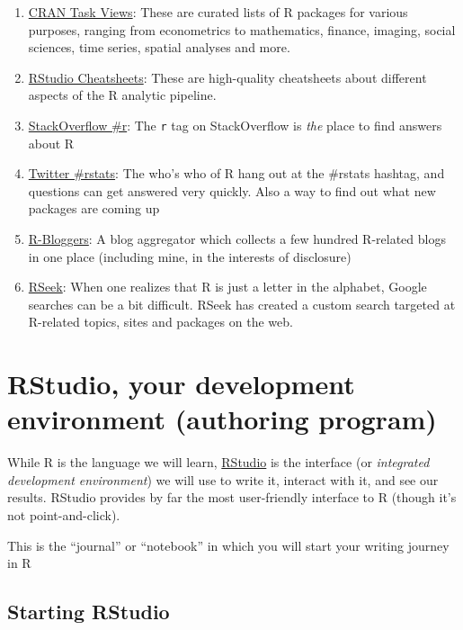 \documentclass[12pt,letterpaperpaper,openany]{book}
\providecommand{\tightlist}{%
  \setlength{\itemsep}{0pt}\setlength{\parskip}{0pt}}
\begin{document}
\begin{enumerate}
\def\labelenumi{\arabic{enumi}.}
\tightlist
\item
  \href{https://cran.rstudio.com/web/views}{CRAN Task Views}: These are curated lists of R packages for various purposes, ranging from econometrics to mathematics, finance, imaging, social sciences, time series, spatial analyses and more.
\item
  \href{https://www.rstudio.com/resources/cheatsheets/}{RStudio Cheatsheets}: These are high-quality
  cheatsheets about different aspects of the R analytic pipeline.
\item
  \href{https://stackoverflow.com/questions/tagged/r}{StackOverflow \#r}: The \texttt{r} tag on StackOverflow is
  \emph{the} place to find answers about R
\item
  \href{https://twitter.com/hashtag/rstats}{Twitter \#rstats}: The who's who of R hang out at the \#rstats hashtag, and questions can get answered very quickly. Also a way to find out what new packages are coming up
\item
  \href{http://www.r-bloggers.com}{R-Bloggers}: A blog aggregator which collects a few hundred R-related blogs in one place (including mine, in the interests of disclosure)
\item
  \href{http://r-seek.org}{RSeek}: When one realizes that R is just a letter in the alphabet, Google searches can be a bit difficult. RSeek has created a custom search targeted at R-related topics, sites and packages on the web.
\end{enumerate}

\hypertarget{rstudio-your-development-environment-authoring-program}{%
\chapter{RStudio, your development environment (authoring program)}\label{rstudio-your-development-environment-authoring-program}}

While R is the language we will learn, \href{http://www.rstudio.com}{RStudio} is the interface
(or \emph{integrated development environment}) we will use to write it, interact with it, and see our
results. RStudio provides by far the most user-friendly interface to R (though it's not point-and-click).

This is the ``journal'' or ``notebook'' in which you will start your writing journey in R

\hypertarget{starting-rstudio}{%
\section*{Starting RStudio}\label{starting-rstudio}}
\end{document}
